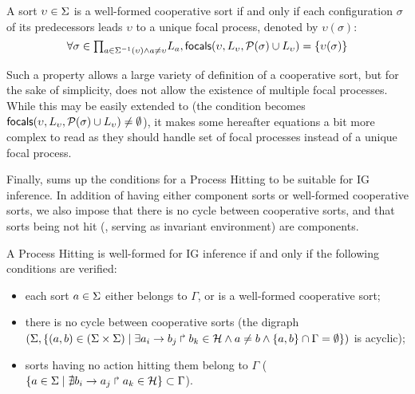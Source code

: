 \begin{property}\label{pro:wf-cooperative-sort}
A sort $\upsilon\in\Sigma$ is a well-formed cooperative sort if and only if
each configuration $\sigma$ of its predecessors leads $\upsilon$ to a unique focal process,
denoted by $\upsilon(\sigma)$:
\[
\forall \sigma \in {\textstyle\prod_{
a\in\Sigma^{-1}(\upsilon) \wedge a\neq \upsilon}}
L_{a},
\mathsf{focals}(\upsilon,L_\upsilon,\mathcal{P}(\sigma)\cup L_\upsilon) = \{ \upsilon(\sigma) \}\]
\end{property}

Such a property allows a large variety of definition of a cooperative sort, but
for the sake of simplicity, does not allow the existence of multiple focal processes.
While this may be easily extended to (the condition becomes 
$\mathsf{focals}(\upsilon,L_\upsilon, \mathcal{P}(\sigma)\cup L_\upsilon)\neq\emptyset$), it makes some
hereafter equations a bit more complex to read as they should handle set of focal processes instead
of a unique focal process.


Finally,  sums up the conditions for a Process Hitting to be suitable for IG
inference.
In addition of having either component sorts or well-formed cooperative sorts, we also impose that
there is no cycle between cooperative sorts, and that
sorts being not hit (\ie{}, serving as invariant environment) are components.

\begin{property}\label{pro:wf-ph}
A Process Hitting is well-formed for IG inference if and only if the following conditions are
verified:
\begin{itemize}
\item 
each sort $a\in\Sigma$ either belongs to $\Gamma$, or is a well-formed cooperative sort;
\item 
there is no cycle between cooperative sorts
(the digraph $(\Sigma,\{(a,b)\in(\Sigma\times\Sigma)\mid \exists a_i\rightarrow b_j\Rsh b_k\in\mathcal{H}
\wedge a\neq b\wedge \{a,b\}\cap\Gamma=\emptyset \})$ is
acyclic);
\item 
sorts having no action hitting them belong to $\Gamma$
($\{ a \in \Sigma\mid \nexists b_i\rightarrow a_j\Rsh a_k\in\mathcal{H}\} \subset \Gamma$).
\end{itemize}
\end{property}

